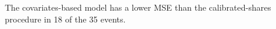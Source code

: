 The covariates-based model has a lower MSE than the calibrated-shares procedure in 18 of the 35 events.